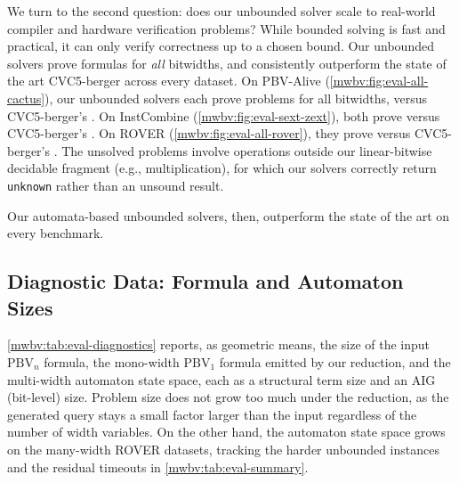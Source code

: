 We turn to the second question: does our unbounded solver scale to real-world compiler and hardware verification problems?
While bounded solving is fast and practical,
it can only verify correctness up to a chosen bound.
Our unbounded solvers prove formulas for \emph{all} bitwidths,
and consistently outperform the state of the art CVC5-berger across every dataset.
On PBV-Alive (\cref{mwbv:fig:eval-all-cactus}), our unbounded solvers each prove \AliveCactusNumSolvedMr{} problems for all bitwidths,
versus CVC5-berger's \AliveCactusNumSolvedC{}.
On InstCombine (\cref{mwbv:fig:eval-sext-zext}), both prove \SextZextInstcombineNumSolvedMr{} versus CVC5-berger's \SextZextInstcombineNumSolvedC{}.
On ROVER (\cref{mwbv:fig:eval-all-rover}), they prove \RoverCactusNumSolvedMr{} versus CVC5-berger's \RoverCactusNumSolvedC{}.
The unsolved problems involve operations outside our linear-bitwise decidable fragment
(e.g., multiplication), for which our solvers correctly return \texttt{unknown}
rather than an unsound result.

Our automata-based unbounded solvers, then, outperform the state of the art on every benchmark.

\subsection{Diagnostic Data: Formula and Automaton Sizes}
\label{mwbv:sec:diagnostics}

\cref{mwbv:tab:eval-diagnostics} reports, as geometric means, the size of the
input $\text{PBV}_n$ formula, the mono-width $\text{PBV}_1$ \qfbv{} formula
emitted by our reduction, and the multi-width automaton state space, each as a
structural term size and an AIG (bit-level) size.
Problem size does not grow too much under the reduction, as the generated \qfbv{}
query stays a small factor larger than the input regardless of the number of
width variables. On the other hand, the automaton state space grows on the many-width ROVER
datasets, tracking the harder unbounded instances and the
residual timeouts in \cref{mwbv:tab:eval-summary}.

\begin{table}[htb]
\centering
\caption{Size diagnostics across the three datasets, reported as geometric means.
For each dataset we give the size of the input $\text{PBV}_n$ formula, the
mono-width $\text{PBV}_1$ \qfbv{} formula emitted by our reduction, and the
multi-width automaton state space, each measured both as a structural term size
(AST nodes) and as an AIG (bit-level) size. The $\text{PBV}_1$ formula stays a
small constant factor larger than the input, confirming the linear-size
reduction; the automaton state space grows on the many-width datasets, tracking
the harder unbounded instances.}
\label{mwbv:tab:eval-diagnostics}
\resizebox{\textwidth}{!}{}
\end{table}


